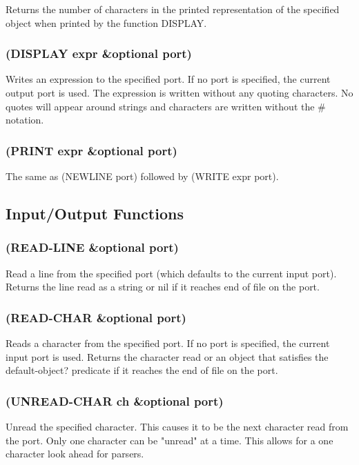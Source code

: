\documentclass[11pt]{article}
\begin{document}
Returns the number of characters in the printed representation of the
specified object when printed by the function DISPLAY.
\subsubsection{(DISPLAY expr \&optional port)}
\label{sec-4-33-4}

Writes an expression to the specified port.  If no port is specified,
the current output port is used.  The expression is written without
any quoting characters.  No quotes will appear around strings and
characters are written without the \# notation.
\subsubsection{(PRINT expr \&optional port)}
\label{sec-4-33-5}

The same as (NEWLINE port) followed by (WRITE expr port).
\subsection{Input/Output Functions}
\label{sec-4-34}

\subsubsection{(READ-LINE \&optional port)}
\label{sec-4-34-1}

Read a line from the specified port (which defaults to the current
input port).  Returns the line read as a string or nil if it reaches
end of file on the port.
\subsubsection{(READ-CHAR \&optional port)}
\label{sec-4-34-2}

Reads a character from the specified port.  If no port is specified,
the current input port is used.  Returns the character read or an
object that satisfies the default-object? predicate if it reaches the
end of file on the port.
\subsubsection{(UNREAD-CHAR ch \&optional port)}
\label{sec-4-34-3}

Unread the specified character.  This causes it to be the next
character read from the port.  Only one character can be "unread" at
a time.  This allows for a one character look ahead for parsers.
\end{document}
